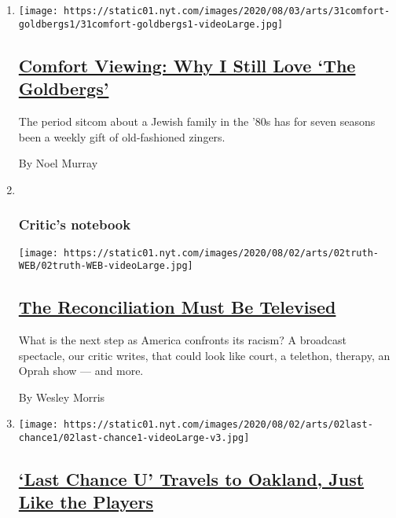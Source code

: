 \begin{enumerate}
\def\labelenumi{\arabic{enumi}.}
\item
  \texttt{[image: https://static01.nyt.com/images/2020/08/03/arts/31comfort-goldbergs1/31comfort-goldbergs1-videoLarge.jpg]}

  \hypertarget{comfort-viewing-why-i-still-love-the-goldbergs}{%
  \subsection{\texorpdfstring{\href{/2020/07/31/arts/television/goldbergs-abc-stream.html}{Comfort
  Viewing: Why I Still Love `The
  Goldbergs'}}{Comfort Viewing: Why I Still Love `The Goldbergs'}}\label{comfort-viewing-why-i-still-love-the-goldbergs}}

  The period sitcom about a Jewish family in the '80s has for seven
  seasons been a weekly gift of old-fashioned zingers.

  By Noel Murray
\item ~
  \hypertarget{critics-notebook-2}{%
  \subsubsection{Critic's notebook}\label{critics-notebook-2}}

  \texttt{[image: https://static01.nyt.com/images/2020/08/02/arts/02truth-WEB/02truth-WEB-videoLarge.jpg]}

  \hypertarget{the-reconciliation-must-be-televised}{%
  \subsection{\texorpdfstring{\href{/2020/07/30/arts/television/the-moment-racism-tv.html}{The
  Reconciliation Must Be
  Televised}}{The Reconciliation Must Be Televised}}\label{the-reconciliation-must-be-televised}}

  What is the next step as America confronts its racism? A broadcast
  spectacle, our critic writes, that could look like court, a telethon,
  therapy, an Oprah show --- and more.

  By Wesley Morris
\item
  \texttt{[image: https://static01.nyt.com/images/2020/08/02/arts/02last-chance1/02last-chance1-videoLarge-v3.jpg]}

  \hypertarget{last-chance-u-travels-to-oakland-just-like-the-players}{%
  \subsection{\texorpdfstring{\href{/2020/07/28/arts/television/last-chance-u-season-5.html}{`Last
  Chance U' Travels to Oakland, Just Like the
  Players}}{`Last Chance U' Travels to Oakland, Just Like the Players}}\label{last-chance-u-travels-to-oakland-just-like-the-players}}


\end{enumerate}
